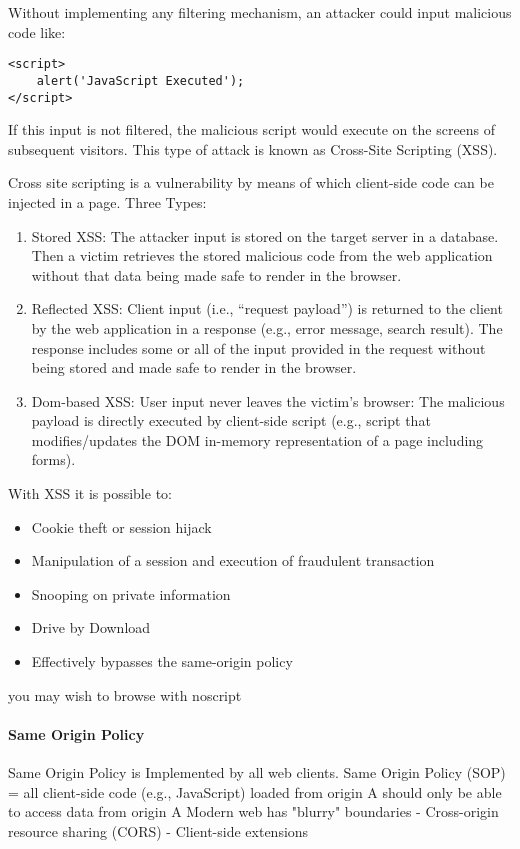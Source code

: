 Without implementing any filtering mechanism, an attacker could input malicious code like:
\begin{verbatim}
<script>
    alert('JavaScript Executed');
</script>
\end{verbatim}
If this input is not filtered, the malicious script would execute on the screens of subsequent visitors. 
This type of attack is known as Cross-Site Scripting (XSS).

Cross site scripting is a vulnerability by
means of which client-side code can be
injected in a page.
Three Types:
\begin{enumerate}
    \item Stored XSS: The attacker input is stored on the target server in a database. 
    Then a victim retrieves the stored malicious code from the web application without that data being made safe to render in the browser.
    \item Reflected XSS: Client input (i.e., “request payload”) is returned to the client by the web application in a response (e.g., error message, search result). 
    The response includes some or all of the input provided in the request without being stored and made safe to render in the browser.
    \item Dom-based XSS: User input never leaves the victim's browser:
        The malicious payload is directly executed by client-side script (e.g., script that modifies/updates the DOM in-memory representation of a page including forms).
\end{enumerate}
With XSS it is possible to: 
\begin{itemize}
    \item Cookie theft or session hijack
    \item Manipulation of a session and execution of
    fraudulent transaction
    \item Snooping on private information
    \item Drive by Download
    \item Effectively bypasses the same-origin policy
\end{itemize}
you may wish to browse with noscript

\paragraph*{Same Origin Policy}
Same Origin Policy is Implemented by all web clients. 
Same Origin Policy (SOP) = all client-side
code (e.g., JavaScript) loaded from origin A
should only be able to access data from
origin A
Modern web has "blurry" boundaries
- Cross-origin resource sharing (CORS)
- Client-side extensions

